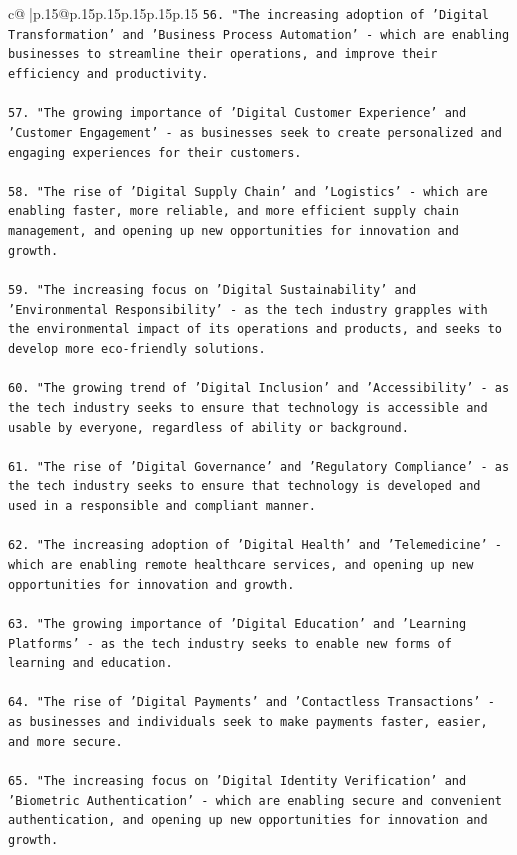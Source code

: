 \documentclass{article}
\begin{document}
{\begin{supertabular}{c@{$\;$}|p{.15\linewidth}@{}p{.15\linewidth}p{.15\linewidth}p{.15\linewidth}p{.15\linewidth}p{.15\linewidth}}
{{{\texttt{56. "The increasing adoption of 'Digital Transformation' and 'Business Process Automation' {-} which are enabling businesses to streamline their operations, and improve their efficiency and productivity.} \\
\\ 
\texttt{57. "The growing importance of 'Digital Customer Experience' and 'Customer Engagement' {-} as businesses seek to create personalized and engaging experiences for their customers.} \\
\\ 
\texttt{58. "The rise of 'Digital Supply Chain' and 'Logistics' {-} which are enabling faster, more reliable, and more efficient supply chain management, and opening up new opportunities for innovation and growth.} \\
\\ 
\texttt{59. "The increasing focus on 'Digital Sustainability' and 'Environmental Responsibility' {-} as the tech industry grapples with the environmental impact of its operations and products, and seeks to develop more eco{-}friendly solutions.} \\
\\ 
\texttt{60. "The growing trend of 'Digital Inclusion' and 'Accessibility' {-} as the tech industry seeks to ensure that technology is accessible and usable by everyone, regardless of ability or background.} \\
\\ 
\texttt{61. "The rise of 'Digital Governance' and 'Regulatory Compliance' {-} as the tech industry seeks to ensure that technology is developed and used in a responsible and compliant manner.} \\
\\ 
\texttt{62. "The increasing adoption of 'Digital Health' and 'Telemedicine' {-} which are enabling remote healthcare services, and opening up new opportunities for innovation and growth.} \\
\\ 
\texttt{63. "The growing importance of 'Digital Education' and 'Learning Platforms' {-} as the tech industry seeks to enable new forms of learning and education.} \\
\\ 
\texttt{64. "The rise of 'Digital Payments' and 'Contactless Transactions' {-} as businesses and individuals seek to make payments faster, easier, and more secure.} \\
\\ 
\texttt{65. "The increasing focus on 'Digital Identity Verification' and 'Biometric Authentication' {-} which are enabling secure and convenient authentication, and opening up new opportunities for innovation and growth.} \\
}}}
\end{supertabular}}
\end{document}
